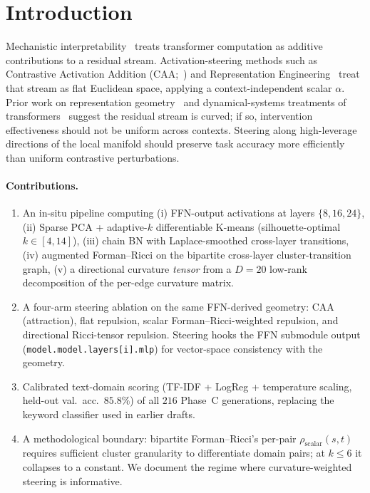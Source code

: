 \documentclass[10pt,twocolumn]{article}
\begin{document}
\section{Introduction}
\label{sec:intro}

Mechanistic interpretability~\citep{olah2020zoom,elhage2021mathematical} treats transformer computation as additive contributions to a residual stream. Activation-steering methods such as Contrastive Activation Addition (CAA;~\citealp{panickssery2023steering}) and Representation Engineering~\citep{zou2023representation} treat that stream as flat Euclidean space, applying a context-independent scalar $\alpha$. Prior work on representation geometry~\citep{cai2021isotropy,ethayarajh2019contextual} and dynamical-systems treatments of transformers~\citep{geshkovski2023mathematical,dong2021attention} suggest the residual stream is curved; if so, intervention effectiveness should not be uniform across contexts. Steering along high-leverage directions of the local manifold should preserve task accuracy more efficiently than uniform contrastive perturbations.

\paragraph{Contributions.}
\begin{enumerate}\itemsep0pt
\item An in-situ pipeline computing (i) FFN-output activations at layers $\{8,16,24\}$, (ii) Sparse PCA + adaptive-$k$ differentiable K-means (silhouette-optimal $k\in[4,14]$), (iii) chain BN with Laplace-smoothed cross-layer transitions, (iv) augmented Forman--Ricci on the bipartite cross-layer cluster-transition graph, (v) a directional curvature \emph{tensor} from a $D{=}20$ low-rank decomposition of the per-edge curvature matrix.
\item A four-arm steering ablation on the same FFN-derived geometry: CAA (attraction), flat repulsion, scalar Forman--Ricci-weighted repulsion, and directional Ricci-tensor repulsion. Steering hooks the FFN submodule output (\texttt{model.model.layers[i].mlp}) for vector-space consistency with the geometry.
\item Calibrated text-domain scoring (TF-IDF + LogReg + temperature scaling, held-out val.\ acc.\ $85.8\%$) of all $216$ Phase~C generations, replacing the keyword classifier used in earlier drafts.
\item A methodological boundary: bipartite Forman--Ricci's per-pair $\rho_{\text{scalar}}(s,t)$ requires sufficient cluster granularity to differentiate domain pairs; at $k{\leq}6$ it collapses to a constant. We document the regime where curvature-weighted steering is informative.
\end{enumerate}
\end{document}
